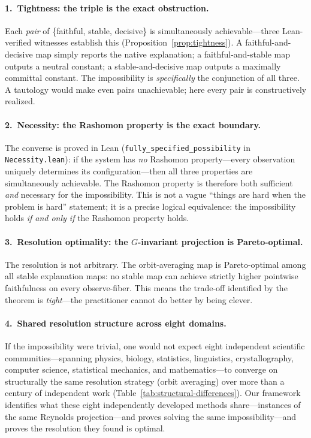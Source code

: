 \documentclass[11pt,a4paper]{article}
\begin{document}
\paragraph{1.\ Tightness: the triple is the exact obstruction.}
Each \emph{pair} of \{faithful, stable, decisive\} is simultaneously
achievable---three Lean-verified witnesses establish this
(Proposition~\ref{prop:tightness}).  A faithful-and-decisive map simply
reports the native explanation; a faithful-and-stable map outputs a neutral
constant; a stable-and-decisive map outputs a maximally committal constant.
The impossibility is \emph{specifically} the conjunction of all three.
A tautology would make even pairs unachievable; here every pair is
constructively realized.

\paragraph{2.\ Necessity: the Rashomon property is the exact boundary.}
The converse is proved in Lean (\texttt{fully\_specified\_possibility} in
\texttt{Necessity.lean}): if the system has \emph{no} Rashomon
property---every observation uniquely determines its configuration---then
all three properties are simultaneously achievable.  The Rashomon property
is therefore both sufficient \emph{and} necessary for the impossibility.
This is not a vague ``things are hard when the problem is hard'' statement;
it is a precise logical equivalence: the impossibility holds \emph{if and
only if} the Rashomon property holds.

\paragraph{3.\ Resolution optimality: the $G$-invariant projection is
Pareto-optimal.}
The resolution is not arbitrary.  The orbit-averaging map is Pareto-optimal
among all stable explanation maps: no stable map can achieve strictly higher
pointwise faithfulness on every observe-fiber.  This means the trade-off
identified by the theorem is \emph{tight}---the practitioner cannot do better
by being clever.

\paragraph{4.\ Shared resolution structure across eight domains.}
If the impossibility were trivial, one would not expect eight independent
scientific communities---spanning physics, biology, statistics, linguistics,
crystallography, computer science, statistical mechanics, and
mathematics---to converge on structurally the same resolution strategy
(orbit averaging) over more than a century of independent work
(Table~\ref{tab:structural-differences}).
Our framework identifies what these eight independently developed methods
share---instances of the same Reynolds projection---and proves
solving the same impossibility---and proves the resolution they found is
optimal.
\end{document}
